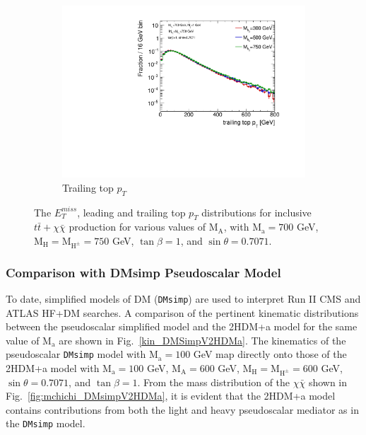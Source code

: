 \begin{figure}
\begin{subfigure}[b]{0.49\textwidth}
    \includegraphics[width=\textwidth]{texinputs/04_grid/figures/DMHF/benchmarking/MDM_1_Ma_700_sinp_0.7071_tanb_1.0_SCAN_MA/top2ptlog.pdf}
    \caption{Trailing top $p_{T}$}
  \end{subfigure}
  \caption{The $E_{T}^{miss}$, leading and trailing top $p_{T}$ distributions for inclusive $t\bar{t}+\chi\bar{\chi}$ production for various values of $\mathrm{M_A}$, with $\mathrm{M_a}=700$ GeV, $\mathrm{M_H}=\mathrm{M_{H^{\pm}}}=750$ GeV, $\tan\beta=1$, and $\sin\theta=0.7071$.}
  \label{fig:kin_MA}
\end{figure}
\subsubsection{Comparison with DMsimp Pseudoscalar Model}

To date, simplified models of DM (\texttt{DMsimp}) are used to interpret Run II CMS and ATLAS HF+DM searches. A comparison of the pertinent kinematic distributions between the pseudoscalar simplified model and the 2HDM+a model for the same value of $\mathrm{M_{a}}$ are shown in Fig.~\ref{kin_DMSimpV2HDMa}. The kinematics of the pseudoscalar \texttt{DMsimp} model with $\mathrm{M_{a}}=100$ GeV map directly onto those of the 2HDM+a model with $\mathrm{M_{a}}=100$ GeV, $\mathrm{M_{A}}=600$ GeV, $\mathrm{M_{H}}=\mathrm{M_{H^{\pm}}}=600$ GeV, $\sin\theta=0.7071$, and $\tan\beta=1$. From the mass distribution of the $\chi\bar{\chi}$ shown in Fig.~\ref{fig:mchichi_DMsimpV2HDMa}, it is evident that the 2HDM+a model contains contributions from both the light and heavy pseudoscalar mediator as in the \texttt{DMsimp} model.

